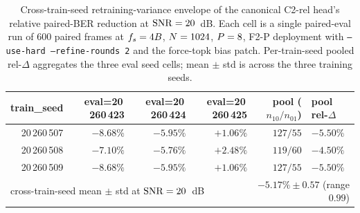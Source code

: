 \begin{table}[t]
\centering
\caption{Cross-train-seed retraining-variance envelope of the canonical C2-rel head's relative paired-BER reduction at $\mathrm{SNR} = 20$~dB. Each cell is a single paired-eval run of $600$ paired frames at $f_s = 4B$, $N = 1024$, $P = 8$, F2-P deployment with \texttt{--use-hard --refine-rounds 2} and the force-topk bias patch. Per-train-seed pooled rel-$\Delta$ aggregates the three eval seed cells; mean $\pm$ std is across the three training seeds.}
\label{tab:varenv}
\small
\begin{tabular}{rrrrrl}
\toprule
train\_seed & eval=20\,260\,423 & eval=20\,260\,424 & eval=20\,260\,425 & pool ($n_{10}/n_{01}$) & pool rel-$\Delta$ \\
\midrule
20\,260\,507 & $-8.68\%$ & $-5.95\%$ & $+1.06\%$ & $127/55$ & $\mathbf{-5.50\%}$ \\
20\,260\,508 & $-7.10\%$ & $-5.76\%$ & $+2.48\%$ & $119/60$ & $\mathbf{-4.50\%}$ \\
20\,260\,509 & $-8.68\%$ & $-5.95\%$ & $+1.06\%$ & $127/55$ & $\mathbf{-5.50\%}$ \\
\midrule
\multicolumn{4}{l}{cross-train-seed mean $\pm$ std at $\mathrm{SNR} = 20$~dB} & \multicolumn{2}{r}{$\mathbf{-5.17\% \pm 0.57}$ (range $0.99$)} \\
\bottomrule
\end{tabular}
\end{table}

